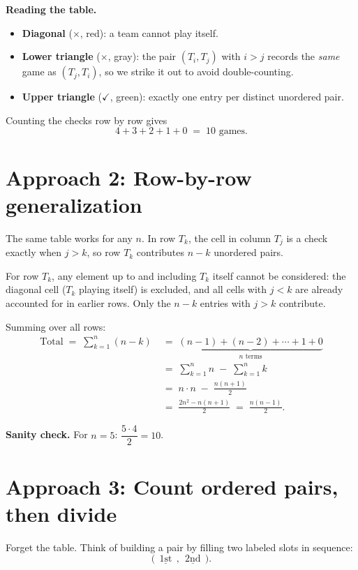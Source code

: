 \documentclass[11pt]{article}
\begin{document}
\textbf{Reading the table.}
\begin{itemize}
  \item \textbf{Diagonal} ($\times$, red): a team cannot play itself.
  \item \textbf{Lower triangle} ($\times$, gray): the pair $(T_i, T_j)$ with $i>j$ records the \emph{same} game as $(T_j, T_i)$, so we strike it out to avoid double-counting.
  \item \textbf{Upper triangle} ($\checkmark$, green): exactly one entry per distinct unordered pair.
\end{itemize}

Counting the checks row by row gives
\[
  4 + 3 + 2 + 1 + 0 \;=\; 10 \text{ games.}
\]

\section*{Approach 2: Row-by-row generalization}

The same table works for any $n$. In row $T_k$, the cell in column $T_j$ is a check exactly when $j > k$, so row $T_k$ contributes $n-k$ unordered pairs.

\begin{tcolorbox}[mybox, title=Key observation]
For row $T_k$, any element up to and including $T_k$ itself cannot be considered: the diagonal cell ($T_k$ playing itself) is excluded, and all cells with $j<k$ are already accounted for in earlier rows. Only the $n-k$ entries with $j>k$ contribute.
\end{tcolorbox}

Summing over all rows:
\[
\begin{aligned}
\text{Total} \;=\; \sum_{k=1}^{n}(n-k)
  &\;=\; \underbrace{(n-1) + (n-2) + \cdots + 1 + 0}_{n \text{ terms}} \\
  &\;=\; \sum_{k=1}^{n} n \;-\; \sum_{k=1}^{n} k \\
  &\;=\; n\cdot n \;-\; \frac{n(n+1)}{2} \\
  &\;=\; \frac{2n^2 - n(n+1)}{2} \;=\; \frac{n(n-1)}{2}.
\end{aligned}
\]

\textbf{Sanity check.} For $n=5$: $\dfrac{5\cdot 4}{2} = 10$. \checkmark

\section*{Approach 3: Count ordered pairs, then divide}

Forget the table. Think of building a pair by filling two labeled slots in sequence:
\[
  \bigl(\ \underline{\ \text{1st}\ }\ ,\ \underline{\ \text{2nd}\ }\ \bigr).
\]
\end{document}

